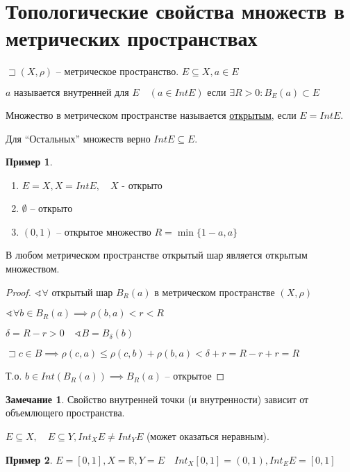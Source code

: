 \documentclass{book}
\newcommand\R{\ensuremath{\mathbb{R}}}
\renewcommand\O{\ensuremath{\emptyset}}
\theoremstyle{definition}
\newtheorem*{note}{Замечание}
\newtheorem*{example}{Пример}
\begin{document}
    \section{Топологические свойства множеств в метрических пространствах}

    \begin{definition}
        $\sqsupset \left( X, \rho \right) $ -- метрическое пространство. $E\subseteq X, a\in E$

        $ a \text{ называется внутренней для } E\quad (a\in Int E) \text{ если } \exists R>0: B_E(a) \subset E $ 
    \end{definition}

    \begin{definition}
    Множество в метрическом пространстве называется \underline{открытым}, если $ E = Int E$.

    Для ``Остальных'' множеств верно $Int E \subseteq E$.
    \end{definition}
    \begin{example}
        \begin{enumerate}
            \item $E = X, X = Int E,\quad X$ - открыто
            \item $\O $ -- открыто
            \item $(0,1)$ -- открытое множество $ R = \min \{1-a, a\}$
    \end{enumerate}
    \end{example}

    \begin{statement}
        В любом метрическом пространстве открытый шар является открытым множеством.
    \end{statement}
    \begin{proof}
        $\sphericalangle \forall $ открытый шар $B_R(a)$ в метрическом пространстве  $(X, \rho)$

        $\sphericalangle \forall b\in B_R(a) \implies  \rho(b,a)<r<R$

        $\delta = R-r>0\quad \sphericalangle B = B_{\delta}(b)$

        $\sqsupset c\in B \implies  \rho(c,a) \leqslant \rho(c,b) + \rho(b,a) < \delta + r = R-r +r = R$

        Т.о. $b\in Int(B_R(a)) \implies  B_R(a)$ -- открытое
    \end{proof}

    \begin{note}
        Свойство внутренней точки (и внутренности) зависит от объемлющего пространства. 

        $E\subseteq X,\quad E\subseteq Y, Int_X E \neq Int_Y E$ (может оказаться неравным).
    \end{note}
    \begin{example}
        $E = [0,1], X=\R, Y = E\quad Int_X [0,1] = (0,1), Int_E E = [0,1]$
    \end{example}
\end{document}
